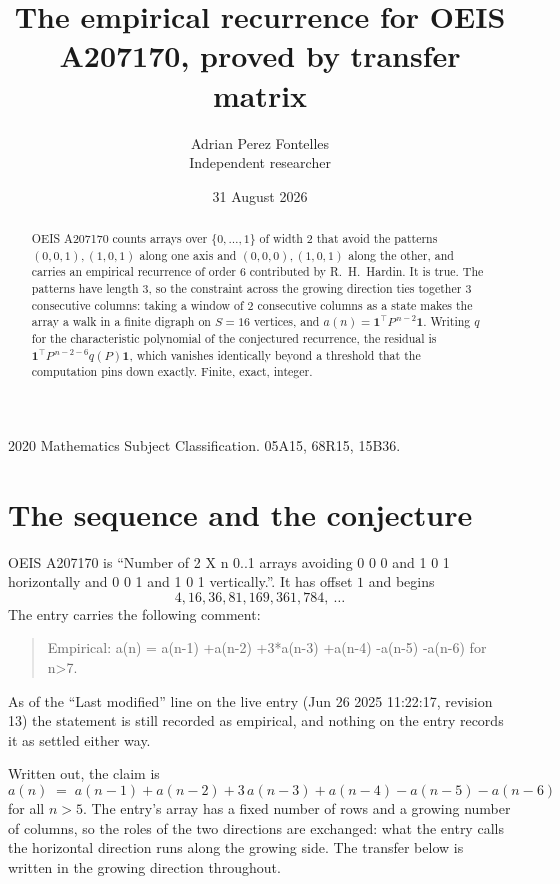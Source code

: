 \documentclass[11pt,a4paper]{article}
\title{The empirical recurrence for OEIS A207170, proved by transfer matrix}
\author{Adrian Perez Fontelles\\ \small Independent researcher}
\date{31 August 2026}
\theoremstyle{plain}
\theoremstyle{definition}
\begin{document}
\maketitle

\begin{abstract}
OEIS A207170 counts arrays over $\{0,\dots,1\}$ of width $2$ that avoid the patterns
$(0,0,1), (1,0,1)$ along one axis and $(0,0,0), (1,0,1)$ along the other, and carries an empirical recurrence of
order $6$ contributed by R.~H.~Hardin. It is true. The patterns have length $3$, so
the constraint across the growing direction ties together $3$ consecutive columns: taking a
window of $2$ consecutive columns as a state makes the array a walk in a finite digraph
on $S=16$ vertices, and $a(n)=\mathbf{1}^{\!\top}P^{\,n-2}\mathbf{1}$. Writing $q$
for the characteristic polynomial of the conjectured recurrence, the residual is
$\mathbf{1}^{\!\top}P^{\,n-2-6}q(P)\mathbf{1}$, which vanishes identically
beyond a threshold that the computation pins down exactly. Finite, exact, integer.
\end{abstract}

\noindent\small 2020 Mathematics Subject Classification. 05A15, 68R15, 15B36.\normalsize

\section{The sequence and the conjecture}

OEIS A207170 is ``Number of 2 X n 0..1 arrays avoiding 0 0 0 and 1 0 1 horizontally and 0 0 1 and 1 0 1 vertically.''. It has offset
$1$ and begins
\[
4, 16, 36, 81, 169, 361, 784,\ \dots
\]
The entry carries the following comment:
\begin{quote}\small
Empirical: a(n) = a(n-1) +a(n-2) +3*a(n-3) +a(n-4) -a(n-5) -a(n-6) for n>7.
\end{quote}
As of the ``Last modified'' line on the live entry (Jun 26 2025 11:22:17, revision
13) the statement is still recorded as empirical, and nothing on the entry
records it as settled either way.

Written out, the claim is
\begin{equation}\label{eq:conj}
a(n)\;=\;a(n-1) + a(n-2) + 3\,a(n-3) + a(n-4) - a(n-5) - a(n-6)
\end{equation}
for all $n>5$. The entry's array has a fixed number of rows and a growing number of
columns, so the roles of the two directions are exchanged: what the entry calls the
horizontal direction runs along the growing side. The transfer below is written in the
growing direction throughout.
\end{document}
